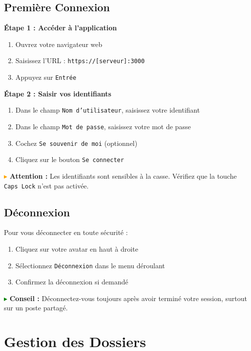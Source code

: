 \documentclass[12pt,a4paper]{report}
\begin{document}
\subsection{Première Connexion}

\textbf{Étape 1 : Accéder à l'application}

\begin{enumerate}[leftmargin=*]
    \item Ouvrez votre navigateur web
    \item Saisissez l'URL : \texttt{https://[serveur]:3000}
    \item Appuyez sur \texttt{Entrée}
\end{enumerate}

\textbf{Étape 2 : Saisir vos identifiants}

\begin{enumerate}[leftmargin=*]
    \item Dans le champ \texttt{Nom d'utilisateur}, saisissez votre identifiant
    \item Dans le champ \texttt{Mot de passe}, saisissez votre mot de passe
    \item Cochez \texttt{Se souvenir de moi} (optionnel)
    \item Cliquez sur le bouton \texttt{Se connecter}
\end{enumerate}

\textcolor{orange}{$\blacktriangleright$} \textbf{Attention :} Les identifiants sont sensibles à la casse. Vérifiez que la touche \texttt{Caps Lock} n'est pas activée.

\subsection{Déconnexion}

Pour vous déconnecter en toute sécurité :

\begin{enumerate}[leftmargin=*]
    \item Cliquez sur votre avatar en haut à droite
    \item Sélectionnez \texttt{Déconnexion} dans le menu déroulant
    \item Confirmez la déconnexion si demandé
\end{enumerate}

\textcolor{green}{$\blacktriangleright$} \textbf{Conseil :} Déconnectez-vous toujours après avoir terminé votre session, surtout sur un poste partagé.

\section{Gestion des Dossiers}
\end{document}

